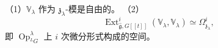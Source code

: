\begin{conjecture}
    （1）$\mathbb{V}_\lambda$ 作为 $\mathfrak{z}_\lambda$-模是自由的。
    （2）
    \begin{equation}
        \operatorname{Ext}^i_{\hat{\mathfrak{g}},G[[t]]}(\mathbb{V}_\lambda,\mathbb{V}_\lambda)
        \simeq\Omega^i_{\mathfrak{z}_\lambda},
        \tag{10.3-29}
    \end{equation}
    即 $\operatorname{Op}^\lambda_{{}^LG}$ 上 $i$ 次微分形式构成的空间。
\end{conjecture}





